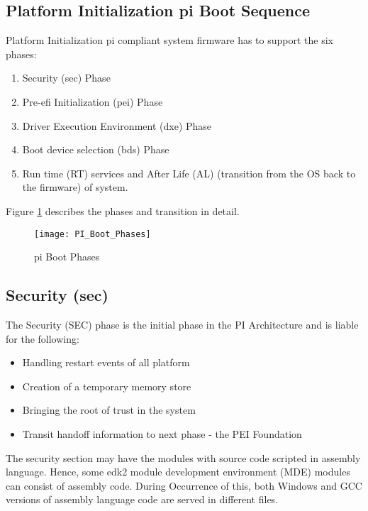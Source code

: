 \subsection{Platform Initialization \gls{pi} Boot Sequence}
Platform Initialization \gls{pi} compliant system firmware has to support the six phases: 
\begin{enumerate}
	\item Security (\gls{sec}) Phase
	\item Pre-efi Initialization (\gls{pei}) Phase
	\item Driver Execution Environment (\gls{dxe}) Phase
	\item Boot device selection (\gls{bds}) Phase
	\item Run time (RT) services and After Life (AL) (transition from the OS back to the firmware) of system. 
\end{enumerate}
Figure \ref{fig:design-pi-boot-phases} describes the phases and transition in detail.

\begin{figure}[h]
	\texttt{[image: PI\_Boot\_Phases]}
	\caption{\gls{pi} Boot Phases}\label{fig:design-pi-boot-phases}
\end{figure}

\subsection{Security (\gls{sec})}
The Security (SEC) phase is the initial phase in the PI Architecture and is liable for the following:
\begin{itemize}
	\item Handling restart events of all platform
	\item Creation of a temporary memory store
	\item Bringing the root of trust in the system
	\item Transit handoff information to next phase - the PEI Foundation
\end{itemize}
The security section may have the modules with source code scripted in assembly language. Hence, some \gls{edk2} module development environment (MDE) modules can consist of assembly code. During Occurrence of this, both Windows and GCC versions of assembly language code are served in different files.

